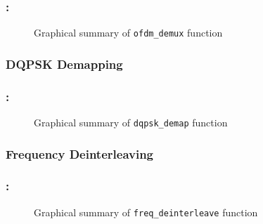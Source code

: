 \documentclass[class=beamer,10pt,crop=false]{standalone}
\begin{document}

\begin{frame}
    \label{slide:dab-proc_ofdm-demux}
    \frametitle{\subsecname : \subsubsecname}
    
    \begin{figure}[htbp]
        \centering
        \captionsetup{type=figure}
        \def\svgwidth{\linewidth}
        {\linespread{0.8}
            \scriptsize
            }
        \caption{Graphical summary of \texttt{ofdm\_demux} function}
        \label{fig:ofdm_demux}
      \end{figure}
      
\end{frame}

\subsubsection{DQPSK Demapping}
\begin{frame}
    \label{slide:dab-proc_dqpsk-demap}
    \frametitle{\subsecname : \subsubsecname}
    
    \begin{figure}[htbp]
        \centering
        \captionsetup{type=figure}
        \def\svgwidth{\linewidth}
        {\linespread{0.8}
            \scriptsize
            }
        \caption{Graphical summary of \texttt{dqpsk\_demap} function}
        \label{fig:dqpsk_demap}
      \end{figure}
      
\end{frame}


\subsubsection{Frequency Deinterleaving}
\begin{frame}
    \label{slide:dab-proc_freq-deinterleave}
    \frametitle{\subsecname : \subsubsecname}
    
    \begin{figure}[htbp]
        \centering
        \captionsetup{type=figure}
        \def\svgwidth{\linewidth}
        {\linespread{0.8}
            \scriptsize
            }
        \caption{Graphical summary of \texttt{freq\_deinterleave} function}
        \label{fig:freq_deinterleave}
      \end{figure}
      
\end{frame}
\end{document}
